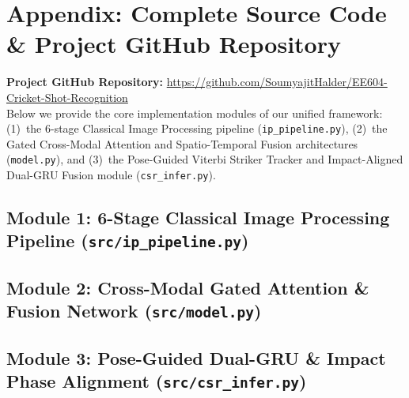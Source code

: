 \clearpage
\onecolumn
\appendix
\section{Appendix: Complete Source Code \& Project GitHub Repository}
\label{sec:appendix}

\noindent\textbf{Project GitHub Repository:} \url{https://github.com/SoumyajitHalder/EE604-Cricket-Shot-Recognition}\\[4pt]
Below we provide the core implementation modules of our unified framework:
(1)~the 6-stage Classical Image Processing pipeline (\texttt{ip\_pipeline.py}),
(2)~the Gated Cross-Modal Attention and Spatio-Temporal Fusion architectures (\texttt{model.py}), and
(3)~the Pose-Guided Viterbi Striker Tracker and Impact-Aligned Dual-GRU Fusion module (\texttt{csr\_infer.py}).

\subsection{Module 1: 6-Stage Classical Image Processing Pipeline (\texttt{src/ip\_pipeline.py})}


\subsection{Module 2: Cross-Modal Gated Attention \& Fusion Network (\texttt{src/model.py})}


\subsection{Module 3: Pose-Guided Dual-GRU \& Impact Phase Alignment (\texttt{src/csr\_infer.py})}

